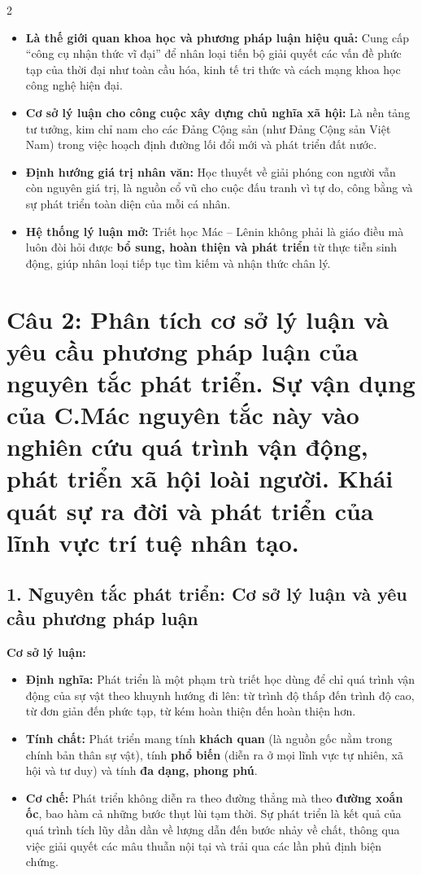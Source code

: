 \documentclass[9pt,a4paper]{extarticle}
\begin{document}
\begin{multicols*}{2}
\begin{itemize}
\item \textbf{Là thế giới quan khoa học và phương pháp luận hiệu quả:} Cung cấp ``công cụ nhận thức vĩ đại'' để nhân loại tiến bộ giải quyết các vấn đề phức tạp của thời đại như toàn cầu hóa, kinh tế tri thức và cách mạng khoa học công nghệ hiện đại.
\item \textbf{Cơ sở lý luận cho công cuộc xây dựng chủ nghĩa xã hội:} Là nền tảng tư tưởng, kim chỉ nam cho các Đảng Cộng sản (như Đảng Cộng sản Việt Nam) trong việc hoạch định đường lối đổi mới và phát triển đất nước.
\item \textbf{Định hướng giá trị nhân văn:} Học thuyết về giải phóng con người vẫn còn nguyên giá trị, là nguồn cổ vũ cho cuộc đấu tranh vì tự do, công bằng và sự phát triển toàn diện của mỗi cá nhân.
\item \textbf{Hệ thống lý luận mở:} Triết học Mác -- Lênin không phải là giáo điều mà luôn đòi hỏi được \textbf{bổ sung, hoàn thiện và phát triển} từ thực tiễn sinh động, giúp nhân loại tiếp tục tìm kiếm và nhận thức chân lý.
\end{itemize}

\section*{Câu 2: Phân tích cơ sở lý luận và yêu cầu phương pháp luận của nguyên tắc phát triển. Sự vận dụng của C.Mác nguyên tắc này vào nghiên cứu quá trình vận động, phát triển xã hội loài người. Khái quát sự ra đời và phát triển của lĩnh vực trí tuệ nhân tạo.}

\subsection*{1. Nguyên tắc phát triển: Cơ sở lý luận và yêu cầu phương pháp luận}

\textbf{Cơ sở lý luận:}

\begin{itemize}
\item \textbf{Định nghĩa:} Phát triển là một phạm trù triết học dùng để chỉ quá trình vận động của sự vật theo khuynh hướng đi lên: từ trình độ thấp đến trình độ cao, từ đơn giản đến phức tạp, từ kém hoàn thiện đến hoàn thiện hơn.
\item \textbf{Tính chất:} Phát triển mang tính \textbf{khách quan} (là nguồn gốc nằm trong chính bản thân sự vật), tính \textbf{phổ biến} (diễn ra ở mọi lĩnh vực tự nhiên, xã hội và tư duy) và tính \textbf{đa dạng, phong phú}.
\item \textbf{Cơ chế:} Phát triển không diễn ra theo đường thẳng mà theo \textbf{đường xoắn ốc}, bao hàm cả những bước thụt lùi tạm thời. Sự phát triển là kết quả của quá trình tích lũy dần dần về lượng dẫn đến bước nhảy về chất, thông qua việc giải quyết các mâu thuẫn nội tại và trải qua các lần phủ định biện chứng.
\end{itemize}


\end{multicols*}
\end{document}
